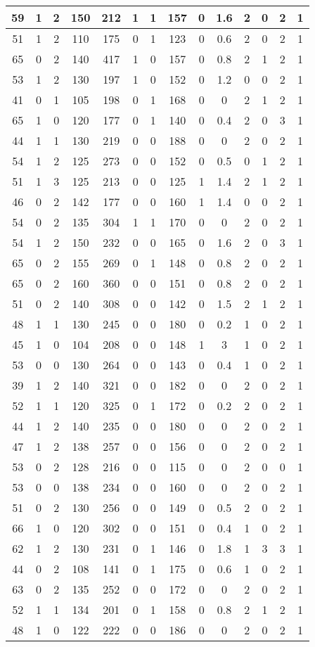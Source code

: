 \documentclass{article}
\begin{document}
\begin{tabular}{
|c|c|c|c|c|c|c|c|c|c|c|c|c|c|}
\hline
59&1&2&150&212&1&1&157&0&1.6&2&0&2&1 \\
\hline
51&1&2&110&175&0&1&123&0&0.6&2&0&2&1 \\
\hline
65&0&2&140&417&1&0&157&0&0.8&2&1&2&1 \\
\hline
53&1&2&130&197&1&0&152&0&1.2&0&0&2&1 \\
\hline
41&0&1&105&198&0&1&168&0&0&2&1&2&1 \\
\hline
65&1&0&120&177&0&1&140&0&0.4&2&0&3&1 \\
\hline
44&1&1&130&219&0&0&188&0&0&2&0&2&1 \\
\hline
54&1&2&125&273&0&0&152&0&0.5&0&1&2&1 \\
\hline
51&1&3&125&213&0&0&125&1&1.4&2&1&2&1 \\
\hline
46&0&2&142&177&0&0&160&1&1.4&0&0&2&1 \\
\hline
54&0&2&135&304&1&1&170&0&0&2&0&2&1 \\
\hline
54&1&2&150&232&0&0&165&0&1.6&2&0&3&1 \\
\hline
65&0&2&155&269&0&1&148&0&0.8&2&0&2&1 \\
\hline
65&0&2&160&360&0&0&151&0&0.8&2&0&2&1 \\
\hline
51&0&2&140&308&0&0&142&0&1.5&2&1&2&1 \\
\hline
48&1&1&130&245&0&0&180&0&0.2&1&0&2&1 \\
\hline
45&1&0&104&208&0&0&148&1&3&1&0&2&1 \\
\hline
53&0&0&130&264&0&0&143&0&0.4&1&0&2&1 \\
\hline
39&1&2&140&321&0&0&182&0&0&2&0&2&1 \\
\hline
52&1&1&120&325&0&1&172&0&0.2&2&0&2&1 \\
\hline
44&1&2&140&235&0&0&180&0&0&2&0&2&1 \\
\hline
47&1&2&138&257&0&0&156&0&0&2&0&2&1 \\
\hline
53&0&2&128&216&0&0&115&0&0&2&0&0&1 \\
\hline
53&0&0&138&234&0&0&160&0&0&2&0&2&1 \\
\hline
51&0&2&130&256&0&0&149&0&0.5&2&0&2&1 \\
\hline
66&1&0&120&302&0&0&151&0&0.4&1&0&2&1 \\
\hline
62&1&2&130&231&0&1&146&0&1.8&1&3&3&1 \\
\hline
44&0&2&108&141&0&1&175&0&0.6&1&0&2&1 \\
\hline
63&0&2&135&252&0&0&172&0&0&2&0&2&1 \\
\hline
52&1&1&134&201&0&1&158&0&0.8&2&1&2&1 \\
\hline
48&1&0&122&222&0&0&186&0&0&2&0&2&1 \\

\end{tabular}
\end{document}
